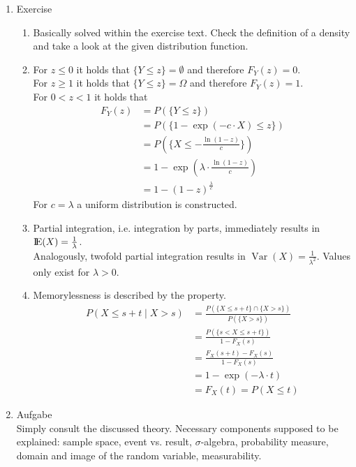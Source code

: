 \documentclass[12pt,a4paper]{article}
\newcommand{\E}{\mbox{I\negthinspace E}}
\DeclareMathOperator{\Var}{Var}
\begin{document}
\begin{enumerate}
\item Exercise 

\begin{enumerate}[label=(\roman*)]

\item Basically solved within the exercise text. Check the definition of a density and take a look at the given distribution function.

\item For $z \leq 0$ it holds that $\{ Y \leq z\} = \emptyset$ and therefore $F_Y (z) = 0$. \\ For $z \geq 1$ it holds that $\{ Y \leq z\} = \Omega$ and therefore $F_Y (z) = 1$. \\ For $0 < z <1$ it holds that 
\begin{align*} 
F_Y (z) &= P(\{ Y \leq z\})  \\ 
&=  P(\{ 1 - \exp (-c \cdot X) \leq z\}) \\
&= P(\{ X \leq -\frac{\ln (1 - z)}{c}\}) \\
&= 1- \exp (\lambda \cdot \frac{\ln (1 - z)}{c}) \\
&= 1 - (1 - z)^{\frac{\lambda}{c}}
\end{align*}
For $c = \lambda$ a uniform distribution is constructed.

\item Partial integration, i.e. integration by parts, immediately results in $\E (X) =  \frac{1}{\lambda}$. \\ Analogously, twofold partial integration results in $\Var (X) = \frac{1}{\lambda^2}$. Values only exist for $\lambda > 0$.

\item Memorylessness is described by the property.
\begin{align*} 
P(X \leq s+ t \mid X > s) &= \frac{P(\{ X \leq s + t\} \cap \{ X > s\} )}{P(\{ X >s\})}  \\ 
&=  \frac{P(\{s < X \leq s + t\})}{1 - F_X (s)} \\
&= \frac{F_X (s + t) - F_X (s)}{1 - F_X (s)} \\
&= 1 - \exp (- \lambda \cdot t) \\
&= F_X (t) = P(X \leq t)
\end{align*}

\end{enumerate}


\item Aufgabe  \\
Simply consult the discussed theory. Necessary components supposed to be explained: sample space, event vs. result, $\sigma$-algebra, probability measure, domain and image of the random variable, measurability.


\end{enumerate}
\end{document}
